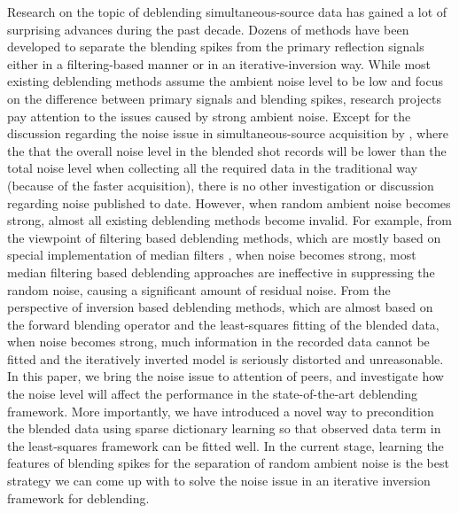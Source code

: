 Research on the topic of deblending simultaneous-source data has gained a lot of surprising advances during the past decade. Dozens of methods have been developed to separate the blending spikes from the primary reflection signals either in a filtering-based manner or in an iterative-inversion way. While most existing deblending methods assume the ambient noise level to be low \cite[]{berk2013} and focus on the difference between primary signals and blending spikes, research projects  pay attention to the issues caused by strong ambient noise. Except for the discussion regarding the noise issue in simultaneous-source acquisition by \cite{berk2013}, where the  that the overall noise level in the blended shot records will be lower than the total noise level when collecting all the required data in the traditional way (because of the faster acquisition), there is no other investigation or discussion regarding noise published to date. However, when random ambient noise becomes strong, almost all existing deblending methods become invalid. For example, from the viewpoint of filtering based deblending methods, which are mostly based on special implementation of median filters \cite[]{mediandeblend,shuwei2016,baimin2017jse1,weilin2018grsl,sosvmf}, when noise becomes strong, most median filtering based deblending approaches are ineffective in suppressing the random noise, causing a significant amount of residual noise. From the perspective of inversion based deblending methods, which are almost based on the forward blending operator and the least-squares fitting of the blended data, when noise becomes strong, much information in the recorded data cannot be fitted and the iteratively inverted model is seriously distorted and unreasonable. In this paper, we bring the noise issue to attention of  peers, and investigate how the noise level will affect the performance in the state-of-the-art deblending framework. More importantly, we have introduced a novel way to precondition the blended data using sparse dictionary learning so that observed data term in the least-squares framework can be fitted well. In the current stage, learning the features of blending spikes for the separation of random ambient noise is the best strategy we can come up with to solve the noise issue in an iterative inversion framework for deblending.

